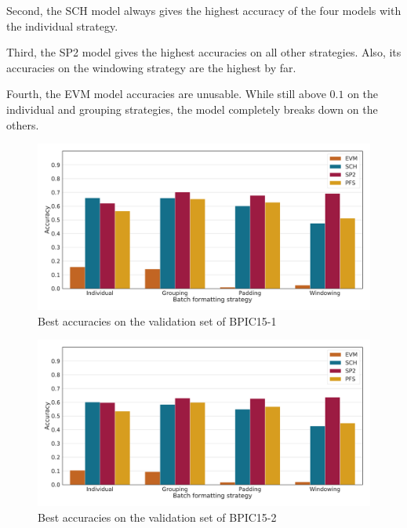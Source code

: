Second, the SCH model always gives the highest accuracy of the four models with the individual strategy.

Third, the SP2 model gives the highest accuracies on all other strategies.
Also, its accuracies on the windowing strategy are the highest by far.

Fourth, the EVM model accuracies are unusable. While still above $0.1$ on the individual and grouping strategies, the model completely breaks down on the others.

\begin{figure}[!htb]
    \centering
    \includegraphics[width=\textwidth]{gfx/bpic2015_1/accuracies.pdf}
    \caption{Best accuracies on the validation set of BPIC15-1}
    \label{fig:max-accuracies-bpic2015-1}
\end{figure}
\begin{figure}[!htb]
    \centering
    \includegraphics[width=\textwidth]{gfx/bpic2015_2/accuracies.pdf}
    \caption{Best accuracies on the validation set of BPIC15-2}
    \label{fig:max-accuracies-bpic2015-2}
\end{figure}

